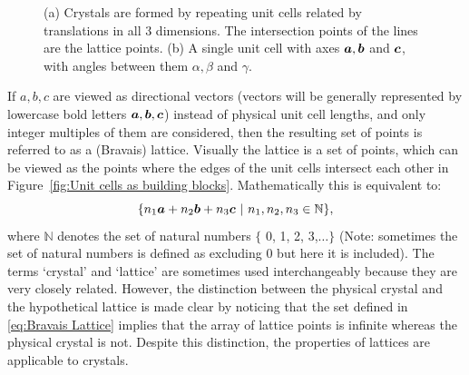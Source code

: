 \begin{figure}[H]
\begin{subfigure}[b]{0.4\textwidth}
                    \caption{}
                    \label{fig:Unit cell definition}
            \end{subfigure}
            \caption[Lattice definition.]{(a) Crystals are formed by repeating unit cells related by translations in all 3 dimensions.
            The intersection points of the lines are the lattice points.
            (b) A single unit cell with axes $\boldsymbol{a}, \boldsymbol{b}$ and $\boldsymbol{c}$, with angles between them $\alpha, \beta$ and $\gamma$. \cite{drenth2012}}
    		\label{fig:Introduction-Unit Cells}
        \end{figure}
        If $a, b, c$ are viewed as directional vectors (vectors will be generally represented by lowercase bold letters {$\boldsymbol{a}, \boldsymbol{b}, \boldsymbol{c}$}) instead of physical unit cell lengths, and only integer multiples of them are considered, then the resulting set of points is referred to as a (Bravais) lattice.
        Visually the lattice is a set of points, which can be viewed as the points where the edges of the unit cells intersect each other in Figure~\ref{fig:Unit cells as building blocks}.
        Mathematically this is equivalent to:
        \begin{equation}
            \{n_1 \boldsymbol{a} + n_2 \boldsymbol{b} + n_3 \boldsymbol{c}\ |\ n_1, n_2, n_3 \in \mathbb{N} \},
            \label{eq:Bravais Lattice}
        \end{equation}
        where $\mathbb{N}$ denotes the set of natural numbers $\{$ 0, 1, 2, 3,$\ldots \}$ (Note: sometimes the set of natural numbers is defined as excluding 0 but here it is included).
        The terms `crystal' and `lattice' are sometimes used interchangeably because they are very closely related.
        However, the distinction between the physical crystal and the hypothetical lattice is made clear by noticing that the set defined in \ref{eq:Bravais Lattice} implies that the array of lattice points is infinite whereas the physical crystal is not.
        Despite this distinction, the properties of lattices are applicable to crystals.

